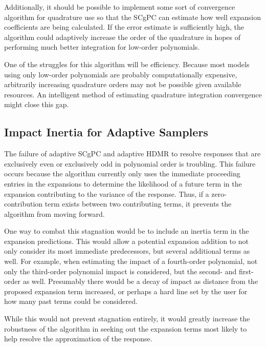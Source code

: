 Additionally, it should be possible to implement some sort of convergence algorithm for quadrature use so that
the SCgPC can estimate how well expansion coefficients are being calculated.  If the error estimate is
sufficiently high, the algorithm could adaptively increase the order of the quadrature in hopes of performing
much better integration for low-order polynomials.

One of the struggles for this algorithm will be efficiency.  Because most models using only low-order
polynomials are probably computationally expensive, arbitrarily increasing quadrature orders may not be
possible given available resources.  An intelligent method of estimating quadrature integration convergence
might close this gap.

\subsection{Impact Inertia for Adaptive Samplers}
The failure of adaptive SCgPC and adaptive HDMR to resolve responses that are exclusively even or exclusively
odd in polynomial order is troubling.  This failure occurs because the algorithm currently only uses the
immediate proceeding entries in the expansions to determine the likelihood of a future term in the expansion
contributing to the variance of the response.  Thus, if a zero-contribution term exists between two
contributing terms, it prevents the algorithm from moving forward.

One way to combat this stagnation would be to include an inertia term in the expansion predictions.  This
would allow a potential expansion addition to not only consider its most immediate predecessors, but several
additional terms as well.  For example, when estimating the impact of a fourth-order polynomial, not only the
third-order polynomial impact is considered, but the second- and first-order as well.  Presumably there would
be a decay of impact as distance from the proposed expansion term increased, or perhaps a hard line set by the
user for how many past terms could be considered.

While this would not prevent stagnation entirely, it would greatly increase the robustness of the algorithm in
seeking out the expansion terms most likely to help resolve the approximation of the response.

